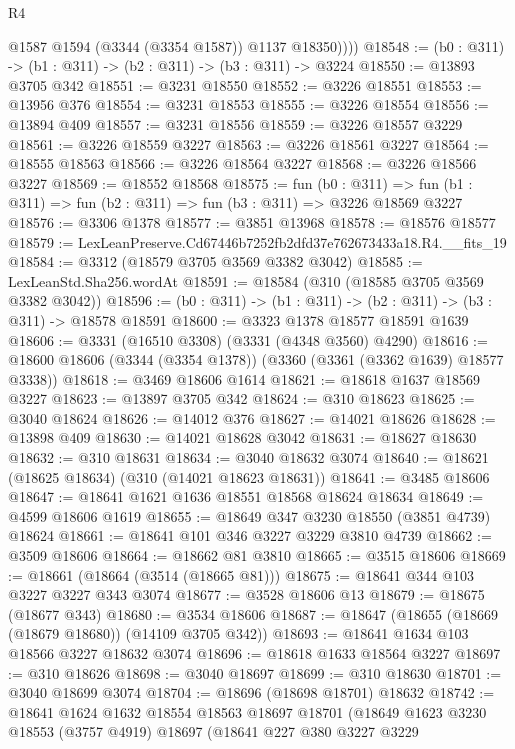\begin{lexlean}{R4}
\begin{coremodule}
            @1587
            @1594
            (@3344 (@3354 @1587))
            @1137
            @18350))))
@18548 := (b0 : @311) -> (b1 : @311) -> (b2 : @311) -> (b3 : @311) -> @3224
@18550 := @13893 @3705 @342
@18551 := @3231 @18550
@18552 := @3226 @18551
@18553 := @13956 @376
@18554 := @3231 @18553
@18555 := @3226 @18554
@18556 := @13894 @409
@18557 := @3231 @18556
@18559 := @3226 @18557 @3229
@18561 := @3226 @18559 @3227
@18563 := @3226 @18561 @3227
@18564 := @18555 @18563
@18566 := @3226 @18564 @3227
@18568 := @3226 @18566 @3227
@18569 := @18552 @18568
@18575 := fun (b0 : @311) =>
  fun (b1 : @311) => fun (b2 : @311) => fun (b3 : @311) => @3226 @18569 @3227
@18576 := @3306 @1378
@18577 := @3851 @13968
@18578 := @18576 @18577
@18579 := LexLeanPreserve.Cd67446b7252fb2dfd37e762673433a18.R4.__fits_19
@18584 := @3312 (@18579 @3705 @3569 @3382 @3042)
@18585 := LexLeanStd.Sha256.wordAt
@18591 := @18584 (@310 (@18585 @3705 @3569 @3382 @3042))
@18596 := (b0 : @311) -> (b1 : @311) -> (b2 : @311) -> (b3 : @311) -> @18578 @18591
@18600 := @3323 @1378 @18577 @18591 @1639
@18606 := @3331 (@16510 @3308) (@3331 (@4348 @3560) @4290)
@18616 := @18600 @18606 (@3344 (@3354 @1378)) (@3360 (@3361 (@3362 @1639) @18577 @3338))
@18618 := @3469 @18606 @1614
@18621 := @18618 @1637 @18569 @3227
@18623 := @13897 @3705 @342
@18624 := @310 @18623
@18625 := @3040 @18624
@18626 := @14012 @376
@18627 := @14021 @18626
@18628 := @13898 @409
@18630 := @14021 @18628 @3042
@18631 := @18627 @18630
@18632 := @310 @18631
@18634 := @3040 @18632 @3074
@18640 := @18621 (@18625 @18634) (@310 (@14021 @18623 @18631))
@18641 := @3485 @18606
@18647 := @18641 @1621 @1636 @18551 @18568 @18624 @18634
@18649 := @4599 @18606 @1619
@18655 := @18649 @347 @3230 @18550 (@3851 @4739) @18624
@18661 := @18641 @101 @346 @3227 @3229 @3810 @4739
@18662 := @3509 @18606
@18664 := @18662 @81 @3810
@18665 := @3515 @18606
@18669 := @18661 (@18664 (@3514 (@18665 @81)))
@18675 := @18641 @344 @103 @3227 @3227 @343 @3074
@18677 := @3528 @18606 @13
@18679 := @18675 (@18677 @343)
@18680 := @3534 @18606
@18687 := @18647 (@18655 (@18669 (@18679 @18680)) (@14109 @3705 @342))
@18693 := @18641 @1634 @103 @18566 @3227 @18632 @3074
@18696 := @18618 @1633 @18564 @3227
@18697 := @310 @18626
@18698 := @3040 @18697
@18699 := @310 @18630
@18701 := @3040 @18699 @3074
@18704 := @18696 (@18698 @18701) @18632
@18742 := @18641
    @1624
    @1632
    @18554
    @18563
    @18697
    @18701
    (@18649
      @1623
      @3230
      @18553
      (@3757 @4919)
      @18697
      (@18641
        @227
        @380
        @3227
        @3229

\end{coremodule}
\end{lexlean}
